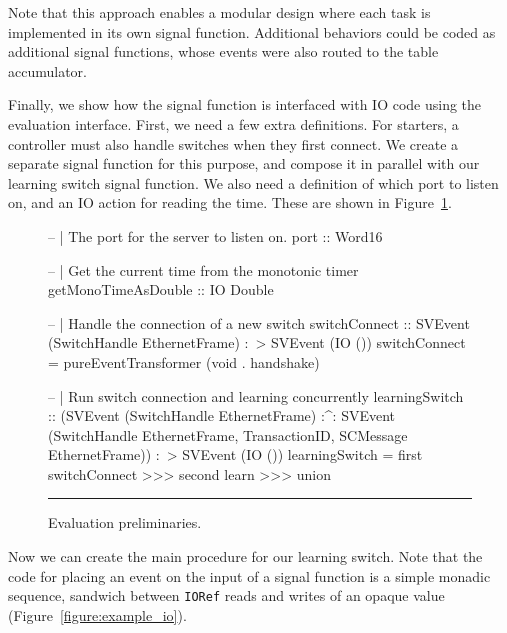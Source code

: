 Note that this approach enables a modular design where each task is implemented
in its own signal function. Additional behaviors could be coded as additional
signal functions, whose events were also routed to the table accumulator.

Finally, we show how the signal function is interfaced with IO code using the
evaluation interface. First, we need a few extra definitions. For starters,
a controller must also handle switches when they first connect. We create a
separate signal function for this purpose, and compose it in parallel with our
learning switch signal function. We also need a definition of which port to
listen on, and an IO action for reading the time. These are shown in
Figure~\ref{figure:example_io_prelim}.

\begin{figure}
\begin{code}

-- | The port for the server to listen on.
port :: Word16

-- | Get the current time from the monotonic timer
getMonoTimeAsDouble :: IO Double

-- | Handle the connection of a new switch          
switchConnect ::     SVEvent (SwitchHandle EthernetFrame)
                 :~> SVEvent (IO ())
switchConnect = pureEventTransformer (void . handshake)

-- | Run switch connection and learning concurrently
learningSwitch ::     (SVEvent (SwitchHandle EthernetFrame) :^:
                       SVEvent (SwitchHandle EthernetFrame,
                                TransactionID,
                                SCMessage EthernetFrame))
                  :~> SVEvent (IO ())
learningSwitch = first switchConnect >>> second learn >>> union
\end{code}
\hrule
\caption{Evaluation preliminaries.}
\label{figure:example_io_prelim}
\end{figure}

Now we can create the main procedure for our learning switch. Note that
the code for placing an event on the input of a signal function is a simple
monadic sequence, sandwich between {\tt IORef} reads and writes of an opaque
value (Figure~\ref{figure:example_io}).


